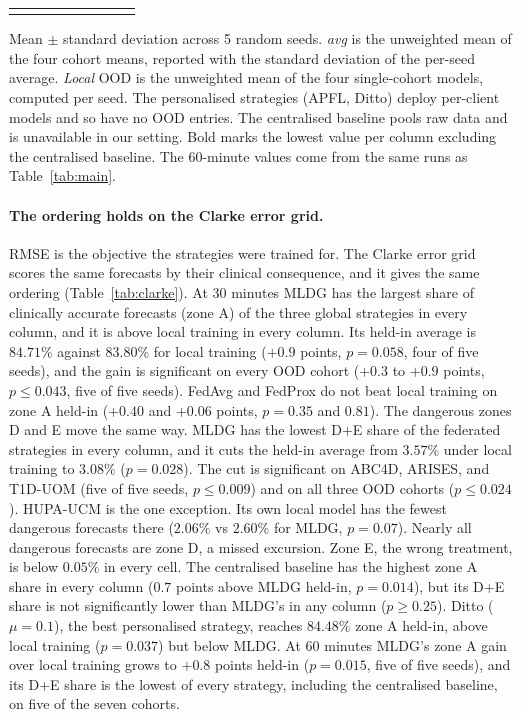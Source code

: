 \documentclass[10pt,letterpaper]{article}
\newlength\savedwidth
\newcommand\thickhline{\noalign{\global\savedwidth\arrayrulewidth\global\arrayrulewidth 2pt}%
\hline
\noalign{\global\arrayrulewidth\savedwidth}}
\begin{document}
\begin{table}[!ht]
{\begin{tabular}{lcccccccc}
\thickhline
\end{tabular}}
\begin{center}
{\small Mean $\pm$ standard deviation across 5 random seeds. \emph{avg} is the
unweighted mean of the four cohort means, reported with the standard deviation
of the per-seed average. \emph{Local} OOD is the unweighted mean of the four
single-cohort models, computed per seed. The personalised strategies (APFL,
Ditto) deploy per-client models and so have no OOD entries. The centralised
baseline pools raw data and is unavailable in our setting. Bold marks the
lowest value per column excluding the centralised baseline. The 60-minute
values come from the same runs as Table~\ref{tab:main}.}
\end{center}
\end{table}

\paragraph{The ordering holds on the Clarke error grid.} RMSE is the
objective the strategies were trained for. The Clarke error grid
\cite{clarke1987} scores the same forecasts by their clinical consequence,
and it gives the same ordering (Table~\ref{tab:clarke}). At 30 minutes MLDG
has the largest share of clinically accurate forecasts (zone A) of the three
global strategies in every column, and it is above local training in every
column. Its held-in average is $84.71\%$ against $83.80\%$ for local
training ($+0.9$ points, $p = 0.058$, four of five seeds), and the gain is
significant on every OOD cohort ($+0.3$ to $+0.9$ points, $p \le 0.043$,
five of five seeds). FedAvg and FedProx do not beat local training on zone A
held-in ($+0.40$ and $+0.06$ points, $p = 0.35$ and $0.81$). The dangerous
zones D and E move the same way. MLDG has the lowest D+E share of the
federated strategies in every column, and it cuts the held-in average from
$3.57\%$ under local training to $3.08\%$ ($p = 0.028$). The cut is
significant on ABC4D, ARISES, and T1D-UOM (five of five seeds,
$p \le 0.009$) and on all three OOD cohorts ($p \le 0.024$). HUPA-UCM is the
one exception. Its own local model has the fewest dangerous forecasts there
($2.06\%$ vs $2.60\%$ for MLDG, $p = 0.07$). Nearly all dangerous forecasts
are zone D, a missed excursion. Zone E, the wrong treatment, is below
$0.05\%$ in every cell. The centralised baseline has the highest zone A share
in every column ($0.7$ points above MLDG held-in, $p = 0.014$), but its D+E
share is not significantly lower than MLDG's in any column ($p \ge 0.25$).
Ditto ($\mu{=}0.1$), the best personalised strategy, reaches $84.48\%$ zone A
held-in, above local training ($p = 0.037$) but below MLDG. At 60 minutes
MLDG's zone A gain over local training grows to $+0.8$ points held-in
($p = 0.015$, five of five seeds), and its D+E share is the lowest of every
strategy, including the centralised baseline, on five of the seven cohorts.
\end{document}
